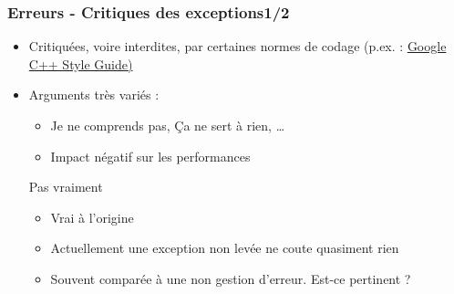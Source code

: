 \documentclass[C++.tex]{subfiles}
\begin{document}
\begin{frame}
	\frametitle{Erreurs - Critiques des exceptions\titlehfill{}1/2}
	\begin{itemize}
		\item Critiquées, voire interdites, par certaines normes de codage (p.ex. : \href{https://google.github.io/styleguide/cppguide.html}{Google C++ Style Guide)}
		\item Arguments très variés :
		\begin{itemize}
			\item \og Je ne comprends pas\fg{}, \og Ça ne sert à rien\fg{}, \ldots
			\item Impact négatif sur les performances
		\end{itemize}

		\pause

		\begin{block}{Pas vraiment}
			\begin{itemize}
				\item Vrai à l'origine
				\item Actuellement une exception non levée ne coute quasiment rien
				\item Souvent comparée à une non gestion d'erreur. Est-ce pertinent ? 
			\end{itemize}
		\end{block}
	\end{itemize}
\end{frame}
\end{document}
